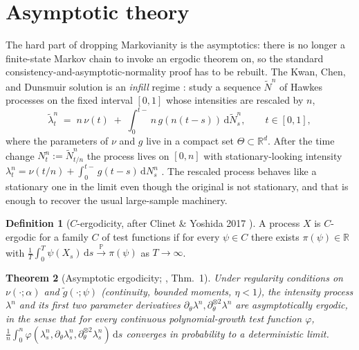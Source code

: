 \documentclass[article,shortnames,nojss]{jss}
\providecommand{\coloneqq}{\mathrel{:=}}
\providecommand{\Rset}{\mathbb{R}}
\newcommand{\rmd}{\,\mathrm{d}}
\newcommand{\PP}{\mathbb{P}}
\newcommand{\1}{\mathbbm{1}}
\newcommand{\defeq}{\coloneqq}
\newcommand{\converginP}{\overset{\PP}{\rightarrow}}
\theoremstyle{plain}
\newtheorem{theorem}{Theorem}
\theoremstyle{definition}
\newtheorem{definition}[theorem]{Definition}
\begin{document}
\section{Asymptotic theory}\label{sec:asymptotics}

The hard part of dropping Markovianity is the asymptotics:
there is no longer a finite-state Markov chain to invoke an
ergodic theorem on, so the standard consistency-and-asymptotic-normality
proof has to be rebuilt. The Kwan, Chen, and Dunsmuir solution
is an \emph{infill} regime
\citep{kwan2024ergodic,kwan2025nonstationary}: study a sequence
$\tilde N^n$ of Hawkes processes on the fixed interval $[0,1]$
whose intensities are rescaled by $n$,
\begin{equation}\label{eq:infill}
  \tilde\lambda^n_t \;=\; n\,\nu(t)
  \;+\; \int_{0}^{t-}\! n\,g\!\left(n(t-s)\right)\rmd \tilde N^n_s,
  \qquad t\in[0,1],
\end{equation}
where the parameters of $\nu$ and $g$ live in a compact set
$\Theta \subset \Rset^d$. After the time change
$N^n_t \defeq \tilde N^n_{t/n}$ the process lives on $[0,n]$
with stationary-looking intensity $\lambda^n_t = \nu(t/n) +
\int_0^{t-} g(t-s) \rmd N^n_s$
\citep[\S2]{kwan2025nonstationary}. The rescaled process
behaves like a stationary one in the limit even though the
original is not stationary, and that is enough to recover the
usual large-sample machinery.

\begin{definition}[$C$-ergodicity, after Clinet \& Yoshida 2017 \citep{clinet2017statistical}]
A process $X$ is $C$-ergodic for a family $C$ of test functions if
for every $\psi \in C$ there exists $\pi(\psi) \in \Rset$ with
$\frac1T \int_0^T \psi(X_s)\rmd s \converginP \pi(\psi)$ as
$T\to\infty$.
\end{definition}

\begin{theorem}[Asymptotic ergodicity; \citep{kwan2025nonstationary}, Thm.~1]
\label{thm:ergodicity}
Under regularity conditions on $\nu(\cdot;\alpha)$ and
$\tilde g(\cdot;\psi)$ (continuity, bounded moments, $\eta<1$), the
intensity process $\lambda^n$ and its first two parameter
derivatives $\partial_\theta\lambda^n,\partial_\theta^{\otimes 2}\lambda^n$
are asymptotically ergodic, in the sense that for every continuous
polynomial-growth test function $\varphi$,
$\frac1n\!\int_0^n\!\varphi(\lambda^n_s,\partial_\theta\lambda^n_s,
\partial_\theta^{\otimes 2}\lambda^n_s)\rmd s$ converges in
probability to a deterministic limit.
\end{theorem}
\end{document}
